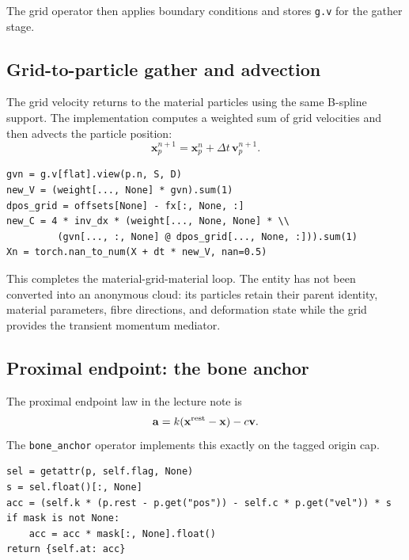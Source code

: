 \documentclass[11pt]{article}
\begin{document}
The grid operator then applies boundary conditions and stores \texttt{g.v} for the gather stage.

\subsection{Grid-to-particle gather and advection}

The grid velocity returns to the material particles using the same B-spline support. The implementation computes a weighted sum of grid velocities and then advects the particle position:
\begin{equation}
\mathbf x^{n+1}_p
=
\mathbf x^n_p+\Delta t\,\mathbf v^{n+1}_p.
\label{eq:auto34}
\end{equation}

\begin{lstlisting}[caption={\texttt{src/plexus/operators/mpm\_gather.py}: weighted grid-to-particle velocity and advection.},label={lst:gather-code}]
gvn = g.v[flat].view(p.n, S, D)
new_V = (weight[..., None] * gvn).sum(1)
dpos_grid = offsets[None] - fx[:, None, :]
new_C = 4 * inv_dx * (weight[..., None, None] * \\
         (gvn[..., :, None] @ dpos_grid[..., None, :])).sum(1)
Xn = torch.nan_to_num(X + dt * new_V, nan=0.5)
\end{lstlisting}

This completes the material-grid-material loop. The entity has not been converted into an anonymous cloud: its particles retain their parent identity, material parameters, fibre directions, and deformation state while the grid provides the transient momentum mediator.

\subsection{Proximal endpoint: the bone anchor}

The proximal endpoint law in the lecture note is
\begin{equation}
\mathbf a
=
 k(\mathbf x^{\rm rest}-\mathbf x)-c\mathbf v.
\label{eq:auto35}
\end{equation}
The \texttt{bone\_anchor} operator implements this exactly on the tagged origin cap.

\begin{lstlisting}[caption={\texttt{prototype/eye/muscle\_ops.py}: proximal endpoint restoring force and damping.},label={lst:anchor-code}]
sel = getattr(p, self.flag, None)
s = sel.float()[:, None]
acc = (self.k * (p.rest - p.get("pos")) - self.c * p.get("vel")) * s
if mask is not None:
    acc = acc * mask[:, None].float()
return {self.at: acc}
\end{lstlisting}
\end{document}
